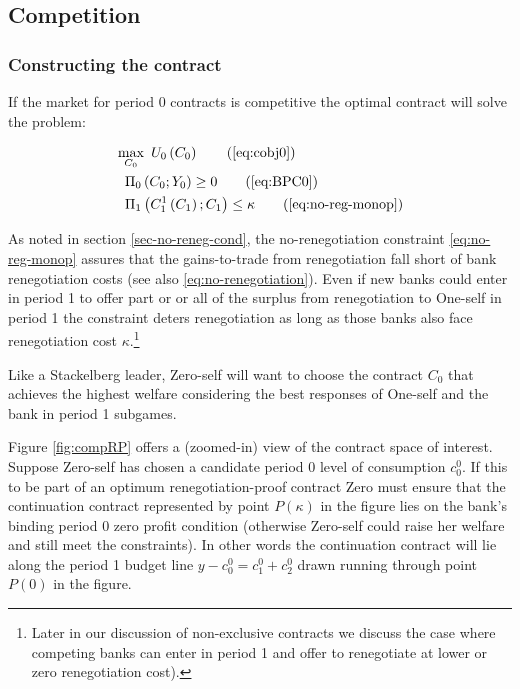 \documentclass[11pt,english]{article}
\theoremstyle{plain}
\theoremstyle{definition}
\begin{document}
\subsection{Competition}

\subsubsection{Constructing the contract}

If the market for period 0 contracts is competitive the optimal contract
will solve the problem:

\begin{align}
 & \max_{C_{0}}\ U_{0}\left(C_{0}\right)\tag{\ref{eq:cobj0}}\\
 & \ \ \Pi_{0}\left(C_{0};Y_{0}\right)\geq0\tag{\ref{eq:BPC0}}\\
 & \ \ \Pi_{1}\left(C_{1}^{1}\left(C_{1}\right);C_{1}\right)\leq\kappa\tag{\ref{eq:no-reg-monop}}
\end{align}

As noted in section \ref{sec-no-reneg-cond}, the no-renegotiation
constraint \ref{eq:no-reg-monop} assures that the gains-to-trade
from renegotiation fall short of bank renegotiation costs (see also
\ref{eq:no-renegotiation}). Even if new banks could enter in period
1 to offer part or or all of the surplus from renegotiation to One-self
in period 1 the constraint deters renegotiation as long as those banks
also face renegotiation cost $\kappa$.\footnote{Later in our discussion of non-exclusive contracts we discuss the
case where competing banks can enter in period 1 and offer to renegotiate
at lower or zero renegotiation cost).}

Like a Stackelberg leader, Zero-self will want to choose the contract
$C_{0}$ that achieves the highest welfare considering the best responses
of One-self and the bank in period 1 subgames.

Figure \ref{fig:compRP} offers a (zoomed-in) view of the
contract space of interest. Suppose Zero-self has chosen a candidate
period 0 level of consumption $c_{0}^{0}$. If this to be part of
an optimum renegotiation-proof contract Zero must ensure that the
continuation contract represented by point $P(\kappa)$ in the figure
lies on the bank's binding period 0 zero profit condition (otherwise
Zero-self could raise her welfare and still meet the constraints).
In other words the continuation contract will lie along the period
1 budget line $y-c_{0}^{0}=c_{1}^{0}+c_{2}^{0}$ drawn running through
point $P(0)$ in the figure.
\end{document}
